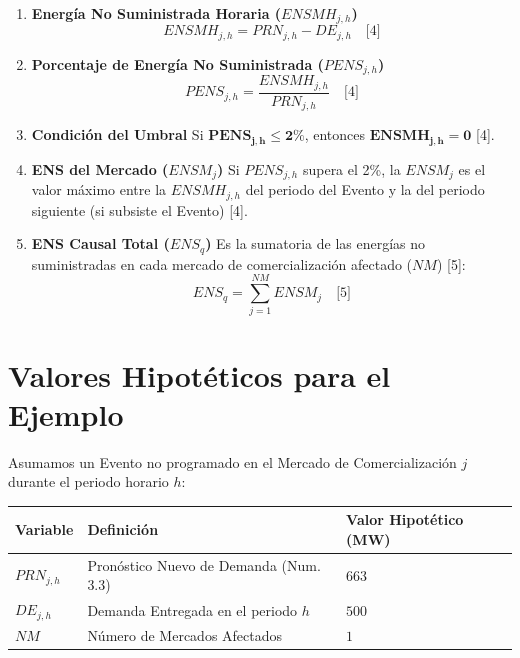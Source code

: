 \documentclass[a5paper]{book}%
\begin{document}
  \begin{enumerate}
  	\item \textbf{Energía No Suministrada Horaria ($ENSMH_{j,h}$)}
  	\begin{equation}
  		ENSMH_{j,h} = PRN_{j,h} - DE_{j,h} \quad \text{[4]}
  	\end{equation}
  	
  	\item \textbf{Porcentaje de Energía No Suministrada ($PENS_{j,h}$)}
  	\begin{equation}
  		PENS_{j,h} = \frac{ENSMH_{j,h}}{PRN_{j,h}} \quad \text{[4]}
  	\end{equation}
  	
  	\item \textbf{Condición del Umbral}
  	Si $\mathbf{PENS_{j,h} \le 2\%}$, entonces $\mathbf{ENSMH_{j,h} = 0}$ [4].
  	
  	\item \textbf{ENS del Mercado ($ENSM_j$)}
  	Si $PENS_{j,h}$ supera el 2\%, la $ENSM_j$ es el valor máximo entre la $ENSMH_{j,h}$ del periodo del Evento y la del periodo siguiente (si subsiste el Evento) [4].
  	
  	\item \textbf{ENS Causal Total ($ENS_q$)}
  	Es la sumatoria de las energías no suministradas en cada mercado de comercialización afectado ($NM$) [5]:
  	\begin{equation}
  		ENS_q = \sum_{j=1}^{NM} ENSM_j \quad \text{[5]}
  	\end{equation}
  \end{enumerate}
  
  \section*{Valores Hipotéticos para el Ejemplo}
  
  Asumamos un Evento no programado en el Mercado de Comercialización $j$ durante el periodo horario $h$:
  
  \begin{center}
  	\begin{tabular}{|l|p{6cm}|p{2cm}|}
  		\hline
  		\textbf{Variable} & \textbf{Definición} & \textbf{Valor Hipotético (MW)} \\
  		\hline
  		$PRN_{j,h}$ & Pronóstico Nuevo de Demanda (Num. 3.3) & $663$ \\
  		$DE_{j,h}$ & Demanda Entregada en el periodo $h$ & $500$ \\
  		$NM$ & Número de Mercados Afectados & $1$ \\
  		\hline
  	\end{tabular}
  \end{center}
  
\end{document}
